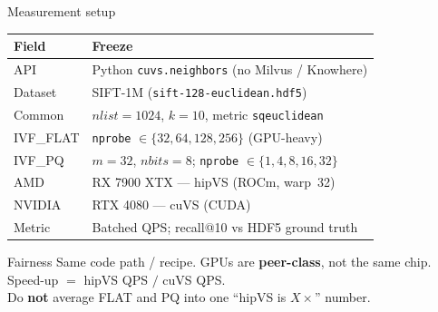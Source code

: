 \documentclass[aspectratio=169,11pt]{beamer}
\begin{document}
\begin{frame}{Measurement setup}
  \footnotesize
  \begin{center}
  \begin{tabular}{@{}ll@{}}
    \toprule
    \textbf{Field} & \textbf{Freeze} \\
    \midrule
    API & Python \texttt{cuvs.neighbors} (no Milvus / Knowhere) \\
    Dataset & SIFT-1M (\texttt{sift-128-euclidean.hdf5}) \\
    Common & $nlist{=}1024$, $k{=}10$, metric \texttt{sqeuclidean} \\
    IVF\_FLAT & \texttt{nprobe} $\in \{32,64,128,256\}$ (GPU-heavy) \\
    IVF\_PQ & $m{=}32$, $nbits{=}8$; \texttt{nprobe} $\in \{1,4,8,16,32\}$ \\
    AMD & RX 7900 XTX --- hipVS (ROCm, warp~32) \\
    NVIDIA & RTX 4080 --- cuVS (CUDA) \\
    Metric & Batched QPS; recall@10 vs HDF5 ground truth \\
    \bottomrule
  \end{tabular}
  \end{center}

  \vspace{0.4em}
  \begin{block}{Fairness}
    Same code path / recipe. GPUs are \textbf{peer-class}, not the same chip.\\
    Speed-up $=$ hipVS QPS $/$ cuVS QPS.\\
    {\footnotesize Do \textbf{not} average FLAT and PQ into one ``hipVS is $X\times$'' number.}
  \end{block}
\end{frame}
\end{document}
